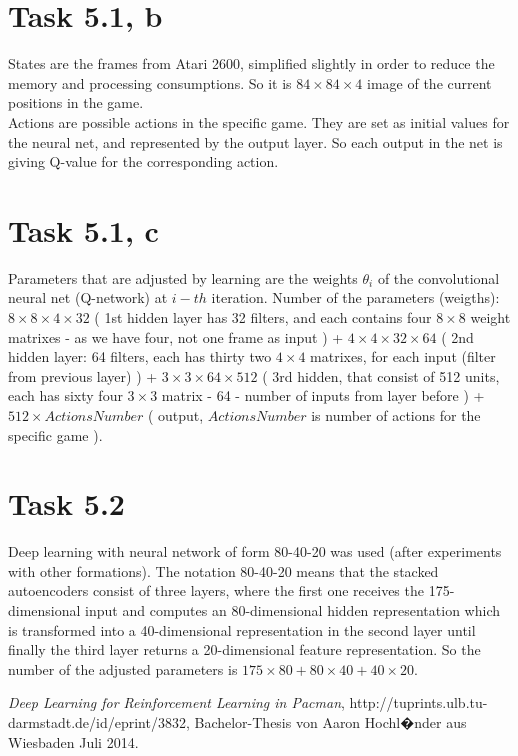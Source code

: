 \documentclass[english]{scrartcl}
\begin{document}
\section*{Task 5.1, b}
States are the frames from Atari 2600, simplified slightly in order to reduce the memory and processing consumptions. So it is $84\times84\times4$ image of the current positions in the game. 
\\Actions are possible actions in the specific game. They are set as initial values for the neural net, and represented by the output layer. So each output in the net is giving Q-value for the corresponding action.

\section*{Task 5.1, c}
Parameters that are adjusted by learning are the weights $\theta_{i}$ of the convolutional neural net (Q-network) at $i-th$ iteration. Number of the parameters (weigths): $8\times 8\times 4 \times 32$ ( 1st hidden layer has 32 filters, and each contains four $8\times 8$ weight matrixes - as we have four, not one frame as input ) + $4\times 4\times 32 \times 64$ ( 2nd hidden layer: 64 filters, each has thirty two $4\times 4$ matrixes, for each input (filter from previous layer) ) + $3\times 3\times 64\times 512$ ( 3rd hidden, that consist of 512 units, each has sixty four $3\times 3$ matrix - 64 - number of inputs from layer before ) + $512\times ActionsNumber$ ( output, $ActionsNumber$ is number of actions for the specific game ).

\section*{Task 5.2}
\cite{deep-learning}
Deep learning with neural network of form 80-40-20 was used (after experiments with other formations). The notation 80-40-20 means that the stacked autoencoders consist of three layers, where
the first one receives the 175-dimensional input and computes an 80-dimensional hidden representation which is transformed into a 40-dimensional representation in the second layer until finally the third layer returns a 20-dimensional feature representation. So the number of the adjusted parameters is $175\times 80 + 80 \times 40 + 40 \times 20$.

\begin{thebibliography}{9}

  \emph{Deep Learning for Reinforcement Learning in Pacman},
   http://tuprints.ulb.tu-darmstadt.de/id/eprint/3832,
  Bachelor-Thesis von Aaron Hochl�nder aus Wiesbaden
  Juli 2014.

\end{thebibliography}
\end{document}
